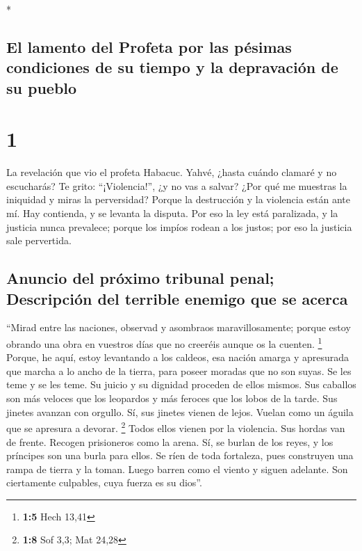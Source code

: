 \begin{paracol}{2} \switchcolumn[0]*

\hypertarget{el-lamento-del-profeta-por-las-puxe9simas-condiciones-de-su-tiempo-y-la-depravaciuxf3n-de-su-pueblo}{%
\subsection{El lamento del Profeta por las pésimas condiciones de su
tiempo y la depravación de su
pueblo}\label{el-lamento-del-profeta-por-las-puxe9simas-condiciones-de-su-tiempo-y-la-depravaciuxf3n-de-su-pueblo}}

\hypertarget{section}{%
\section{1}\label{section}}

 La revelación que vio el profeta Habacuc. 
Yahvé, ¿hasta cuándo clamaré y no escucharás? Te grito: ``¡Violencia!'',
¿y no vas a salvar?  ¿Por qué me muestras la iniquidad y
miras la perversidad? Porque la destrucción y la violencia están ante
mí. Hay contienda, y se levanta la disputa.  Por eso la
ley está paralizada, y la justicia nunca prevalece; porque los impíos
rodean a los justos; por eso la justicia sale pervertida.

\hypertarget{anuncio-del-pruxf3ximo-tribunal-penal-descripciuxf3n-del-terrible-enemigo-que-se-acerca}{%
\subsection{Anuncio del próximo tribunal penal; Descripción del terrible
enemigo que se
acerca}\label{anuncio-del-pruxf3ximo-tribunal-penal-descripciuxf3n-del-terrible-enemigo-que-se-acerca}}

 ``Mirad entre las naciones, observad y asombraos
maravillosamente; porque estoy obrando una obra en vuestros días que no
creeréis aunque os la cuenten. \footnote{\textbf{1:5} Hech 13,41}
 Porque, he aquí, estoy levantando a los caldeos, esa
nación amarga y apresurada que marcha a lo ancho de la tierra, para
poseer moradas que no son suyas.  Se les teme y se les
teme. Su juicio y su dignidad proceden de ellos mismos. 
Sus caballos son más veloces que los leopardos y más feroces que los
lobos de la tarde. Sus jinetes avanzan con orgullo. Sí, sus jinetes
vienen de lejos. Vuelan como un águila que se apresura a devorar.
\footnote{\textbf{1:8} Sof 3,3; Mat 24,28}  Todos ellos
vienen por la violencia. Sus hordas van de frente. Recogen prisioneros
como la arena.  Sí, se burlan de los reyes, y los
príncipes son una burla para ellos. Se ríen de toda fortaleza, pues
construyen una rampa de tierra y la toman.  Luego barren
como el viento y siguen adelante. Son ciertamente culpables, cuya fuerza
es su dios''.


\end{paracol}
